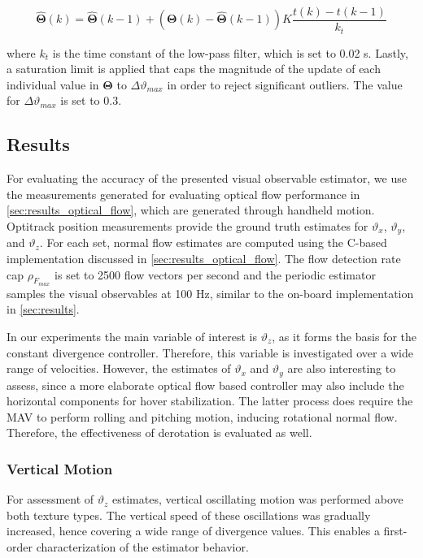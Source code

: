 \begin{equation}
\mathbf{\hat\Theta} (k)=\mathbf{\hat\Theta}(k-1) + \left(\mathbf{\Theta}(k) - \mathbf{\hat\Theta}(k-1)\right)K \frac{t(k)- t(k-1)}{k_t}
\end{equation}

where $k_t$ is the time constant of the low-pass filter, which is set to 0.02 s. Lastly, a saturation limit is applied that caps the magnitude of the update of each individual value in $\mathbf{\Theta}$ to $\Delta \vartheta_{max}$ in order to reject significant outliers. The value for $\Delta \vartheta_{max}$ is set to 0.3.

\subsection{Results}
\label{sec:results_scaled_velocity}
For evaluating the accuracy of the presented visual observable estimator, we use the measurements generated for evaluating optical flow performance in \cref{sec:results_optical_flow}, which are generated through handheld motion. Optitrack position measurements provide the ground truth estimates for $\vartheta_x$, $\vartheta_y$, and $\vartheta_z$. For each set, normal flow estimates are computed using the C-based implementation discussed in \cref{sec:results_optical_flow}. The flow detection rate cap $\rho_{F_{max}}$ is set to 2500 flow vectors per second and the periodic estimator samples the visual observables at 100 Hz, similar to the on-board implementation in \cref{sec:results}.

In our experiments the main variable of interest is $\vartheta_z$, as it forms the basis for the constant divergence controller. Therefore, this variable is investigated over a wide range of velocities. However, the estimates of $\vartheta_x$ and $\vartheta_y$ are also interesting to assess, since a more elaborate optical flow based controller may also include the horizontal components for hover stabilization. The latter process does require the MAV to perform rolling and pitching motion, inducing rotational normal flow. Therefore, the effectiveness of derotation is evaluated as well.

\subsubsection{Vertical Motion}
For assessment of $\vartheta_z$ estimates, vertical oscillating motion was performed above both texture types. The vertical speed of these oscillations was gradually increased, hence covering a wide range of divergence values. This enables a first-order characterization of the estimator behavior.

